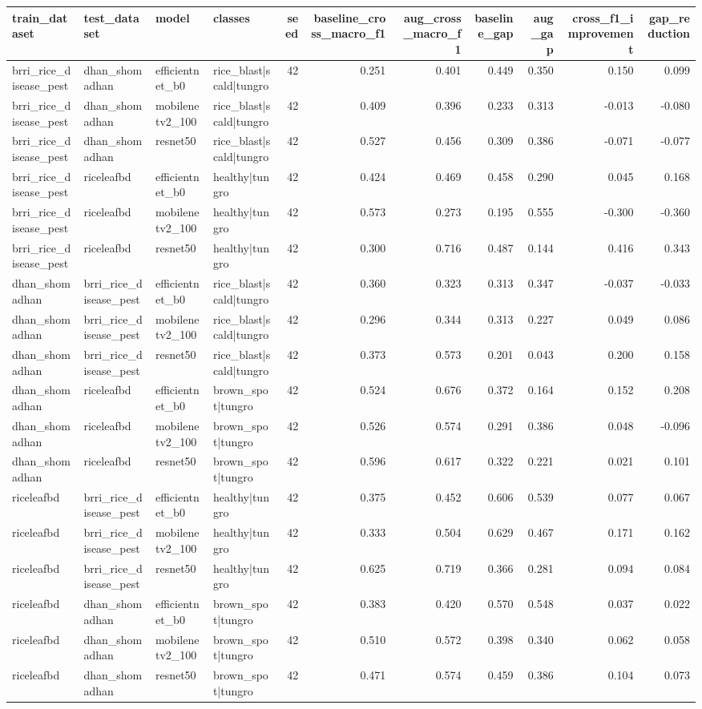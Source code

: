 \begin{tabular}{llllrrrrrrr}
\toprule
train_dataset & test_dataset & model & classes & seed & baseline_cross_macro_f1 & aug_cross_macro_f1 & baseline_gap & aug_gap & cross_f1_improvement & gap_reduction \\
\midrule
brri_rice_disease_pest & dhan_shomadhan & efficientnet_b0 & rice_blast|scald|tungro & 42 & 0.251 & 0.401 & 0.449 & 0.350 & 0.150 & 0.099 \\
brri_rice_disease_pest & dhan_shomadhan & mobilenetv2_100 & rice_blast|scald|tungro & 42 & 0.409 & 0.396 & 0.233 & 0.313 & -0.013 & -0.080 \\
brri_rice_disease_pest & dhan_shomadhan & resnet50 & rice_blast|scald|tungro & 42 & 0.527 & 0.456 & 0.309 & 0.386 & -0.071 & -0.077 \\
brri_rice_disease_pest & riceleafbd & efficientnet_b0 & healthy|tungro & 42 & 0.424 & 0.469 & 0.458 & 0.290 & 0.045 & 0.168 \\
brri_rice_disease_pest & riceleafbd & mobilenetv2_100 & healthy|tungro & 42 & 0.573 & 0.273 & 0.195 & 0.555 & -0.300 & -0.360 \\
brri_rice_disease_pest & riceleafbd & resnet50 & healthy|tungro & 42 & 0.300 & 0.716 & 0.487 & 0.144 & 0.416 & 0.343 \\
dhan_shomadhan & brri_rice_disease_pest & efficientnet_b0 & rice_blast|scald|tungro & 42 & 0.360 & 0.323 & 0.313 & 0.347 & -0.037 & -0.033 \\
dhan_shomadhan & brri_rice_disease_pest & mobilenetv2_100 & rice_blast|scald|tungro & 42 & 0.296 & 0.344 & 0.313 & 0.227 & 0.049 & 0.086 \\
dhan_shomadhan & brri_rice_disease_pest & resnet50 & rice_blast|scald|tungro & 42 & 0.373 & 0.573 & 0.201 & 0.043 & 0.200 & 0.158 \\
dhan_shomadhan & riceleafbd & efficientnet_b0 & brown_spot|tungro & 42 & 0.524 & 0.676 & 0.372 & 0.164 & 0.152 & 0.208 \\
dhan_shomadhan & riceleafbd & mobilenetv2_100 & brown_spot|tungro & 42 & 0.526 & 0.574 & 0.291 & 0.386 & 0.048 & -0.096 \\
dhan_shomadhan & riceleafbd & resnet50 & brown_spot|tungro & 42 & 0.596 & 0.617 & 0.322 & 0.221 & 0.021 & 0.101 \\
riceleafbd & brri_rice_disease_pest & efficientnet_b0 & healthy|tungro & 42 & 0.375 & 0.452 & 0.606 & 0.539 & 0.077 & 0.067 \\
riceleafbd & brri_rice_disease_pest & mobilenetv2_100 & healthy|tungro & 42 & 0.333 & 0.504 & 0.629 & 0.467 & 0.171 & 0.162 \\
riceleafbd & brri_rice_disease_pest & resnet50 & healthy|tungro & 42 & 0.625 & 0.719 & 0.366 & 0.281 & 0.094 & 0.084 \\
riceleafbd & dhan_shomadhan & efficientnet_b0 & brown_spot|tungro & 42 & 0.383 & 0.420 & 0.570 & 0.548 & 0.037 & 0.022 \\
riceleafbd & dhan_shomadhan & mobilenetv2_100 & brown_spot|tungro & 42 & 0.510 & 0.572 & 0.398 & 0.340 & 0.062 & 0.058 \\
riceleafbd & dhan_shomadhan & resnet50 & brown_spot|tungro & 42 & 0.471 & 0.574 & 0.459 & 0.386 & 0.104 & 0.073 \\
\bottomrule
\end{tabular}
